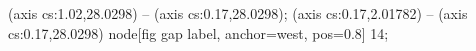  (axis cs:1.02,28.0298) -- (axis cs:0.17,28.0298);
 (axis cs:0.17,2.01782) -- (axis cs:0.17,28.0298)
  node[fig gap label, anchor=west, pos=0.8] {\texttimes{}14};
